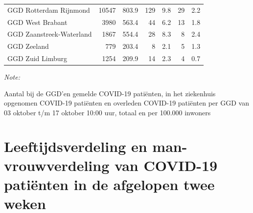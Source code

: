 \documentclass[
  english,
  man,floatsintext]{apa6}
\begin{document}
\begin{table}[H]
\begin{threeparttable}
\begin{tabular}{lrrrrrr}
GGD Rotterdam Rijnmond & 10547 & 803.9 & 129 & 9.8 & 29 & 2.2\\
GGD West Brabant & 3980 & 563.4 & 44 & 6.2 & 13 & 1.8\\
GGD Zaanstreek-Waterland & 1867 & 554.4 & 28 & 8.3 & 8 & 2.4\\
GGD Zeeland & 779 & 203.4 & 8 & 2.1 & 5 & 1.3\\
GGD Zuid Limburg & 1254 & 209.9 & 14 & 2.3 & 4 & 0.7\\
\bottomrule
\end{tabular}
\begin{tablenotes}
\item \textit{Note: } 
\item Aantal bij de GGD’en gemelde COVID-19 patiënten, in het ziekenhuis opgenomen COVID-19 patiënten en overleden COVID-19 patiënten per GGD van 03 oktober t/m 17 oktober 10:00 uur, totaal en per 100.000 inwoners
\end{tablenotes}
\end{threeparttable}
\endgroup{}
\end{table}

\newpage

\hypertarget{leeftijdsverdeling-en-man-vrouwverdeling-van-covid-19-patiuxebnten-in-de-afgelopen-twee-weken}{%
\section{Leeftijdsverdeling en man-vrouwverdeling van COVID-19 patiënten in de afgelopen twee weken}\label{leeftijdsverdeling-en-man-vrouwverdeling-van-covid-19-patiuxebnten-in-de-afgelopen-twee-weken}}
\end{document}
